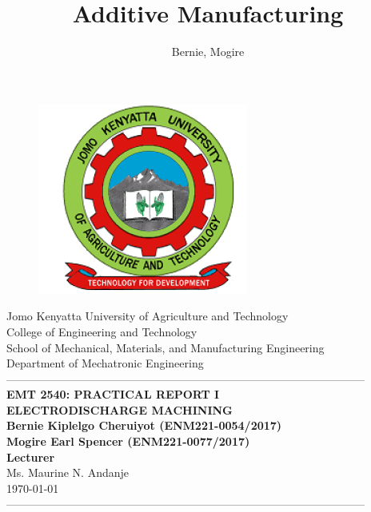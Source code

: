 \documentclass[12pt,fleqn]{article}
\author{Bernie, Mogire}
\title{Additive Manufacturing}
\begin{document}
\begin{titlepage}
  \begin{center}
      \vspace*{-4.0cm}
    \begin{figure}[!h]
\centering
\includegraphics[width=0.3 \linewidth] {Figures/JKUAT_logo}
\label{fig:jomologo}
\end{figure}
   \large{Jomo Kenyatta University of Agriculture and Technology}\\
    \large{College of Engineering and Technology}\\
    \large{School of Mechanical, Materials, and Manufacturing Engineering}\\
   \large{Department of Mechatronic Engineering}\\

    ------------------------------------------------------------------------------------------------\\[1.0cm]
    \LARGE{\textbf{EMT 2540: PRACTICAL REPORT I}}\\[0.6cm]
    \LARGE{\textbf{ELECTRODISCHARGE MACHINING
            }}\\[1.5cm]

    \vspace{0.5cm}
    \large{\textbf{Bernie Kiplelgo Cheruiyot (ENM221-0054/2017)
            }}\\
     \large{\textbf{Mogire Earl Spencer (ENM221-0077/2017)
            }}\\[1.0cm]
    \large{\textbf{Lecturer}}\\
   \large{Ms. Maurine N. Andanje}\\
    \large{\small{\today}}\\
    ------------------------------------------------------------------------------------------------\\[1.5cm]
  \end{center}
\end{titlepage}
%
\end{document}
